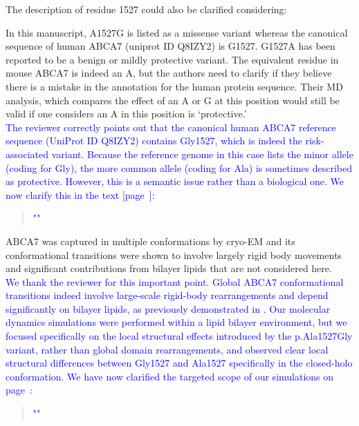 \documentclass[12pt]{article}
\begin{document}
The description of residue 1527 could also be clarified considering:

In this manuscript, A1527G is listed as a missense variant whereas the canonical sequence of human ABCA7 (uniprot ID Q8IZY2) is G1527. G1527A has been reported to be a benign or mildly protective variant. The equivalent residue in mouse ABCA7 is indeed an A, but the authors need to clarify if they believe there is a mistake in the annotation for the human protein sequence. Their MD analysis, which compares the effect of an A or G at this position would still be valid if one considers an A in this position is ‘protective.’\\
\textcolor{blue}{The reviewer correctly points out that the canonical human ABCA7 reference sequence (UniProt ID Q8IZY2) contains Gly1527, which is indeed the risk-associated variant. Because the reference genome in this case lists the minor allele (coding for Gly), the more common allele (coding for Ala) is sometimes described as protective. However, this is a semantic issue rather than a biological one. We now clarify this in the text [page~\pageref{quoteL-label}]:}
\begin{quote}
	\textcolor{blue}{"}\quoteL\textcolor{blue}{"}\\
\end{quote}

ABCA7 was captured in multiple conformations by cryo-EM and its conformational transitions were shown to involve largely rigid body movements and significant contributions from bilayer lipids that are not considered here.\\
\textcolor{blue}{We thank the reviewer for this important point. Global ABCA7 conformational transitions indeed involve large-scale rigid-body rearrangements and depend significantly on bilayer lipids, as previously demonstrated in \cite{Le2023-on}. Our molecular dynamics simulations were performed within a lipid bilayer environment, but we focused specifically on the local structural effects introduced by the p.Ala1527Gly variant, rather than global domain rearrangements, and observed clear local structural differences between Gly1527 and Ala1527 specifically in the closed-holo conformation. We have now clarified the targeted scope of our simulations on page~\pageref{quoteP-label}:}
\begin{quote}
	\textcolor{blue}{"}\quoteP\textcolor{blue}{"}\\
\end{quote}
\end{document}
